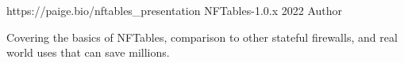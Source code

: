 \begin{cventries}
  \cventry    
    {https://paige.bio/nftables\_presentation}
    {NFTables-1.0.x}
    {2022}
    {Author}
    {
      \begin{cvitems} 
        \item{Covering the basics of NFTables, comparison to other stateful firewalls, and real world uses that can save millions.}
      \end{cvitems}
    }
\end{cventries}
